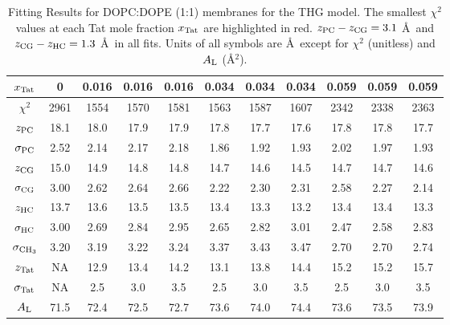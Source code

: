 \begin{table}[htbp]
  \centering
  \begin{tabular}{c|c|ccc|ccc|ccc}
    \hline
    $x_\textrm{Tat}$ & 0 & 0.016 & 0.016 & 0.016 & 0.034 & 0.034 & 0.034 & 0.059 & 0.059 & 0.059 \\
    \hline
    $\chi^2$ & 2961 & {\color{red}1554} & 1570 & 1581 & {\color{red}1563} & 1587 & 1607 & 2342 & {\color{red}2338} & 2363 \\     
    $z_\textrm{PC}$ & 18.1 & 18.0 & 17.9 & 17.9 & 17.8 & 17.7 & 17.6 & 17.8 & 17.8 & 17.7 \\
    $\sigma_\textrm{PC}$ & 2.52 & 2.14 & 2.17 & 2.18 & 1.86 & 1.92 & 1.93 & 2.02 & 1.97 & 1.93 \\
    $z_\textrm{CG}$ & 15.0 & 14.9 & 14.8 & 14.8 & 14.7 & 14.6 & 14.5 & 14.7 & 14.7 & 14.6 \\
    $\sigma_\textrm{CG}$ & 3.00 & 2.62 & 2.64 & 2.66 & 2.22 & 2.30 & 2.31 & 2.58 & 2.27 & 2.14 \\
    $z_\textrm{HC}$ & 13.7 & 13.6 & 13.5 & 13.5 & 13.4 & 13.3 & 13.2 & 13.4 & 13.4 & 13.3 \\ 
    $\sigma_\textrm{HC}$ & 3.00 & 2.69 & 2.84 & 2.95 & 2.65 & 2.82 & 3.01 & 2.47 & 2.58 & 2.83 \\
    $\sigma_{\textrm{CH}_3}$ & 3.20 & 3.19 & 3.22 & 3.24 & 3.37 & 3.43 & 3.47 & 2.70 & 2.70 & 2.74 \\
    $z_\textrm{Tat}$ & NA & 12.9 & 13.4 & 14.2 & 13.1 & 13.8 & 14.4 & 15.2 & 15.2 & 15.7 \\
    $\sigma_\textrm{Tat}$ & NA & 2.5 & 3.0 & 3.5 & 2.5 & 3.0 & 3.5 & 2.5 & 3.0 & 3.5 \\ 
    $A_\textrm{L}$ & 71.5 & 72.4 & 72.5 & 72.7 & 73.6 & 74.0 & 74.4 & 73.6 & 73.5 & 73.9 \\
    \hline
  \end{tabular}
  \caption[Fitting Results for DOPC:DOPE (1:1) membranes for the THG model]
  {Fitting Results for DOPC:DOPE (1:1) membranes for the THG model. 
  The smallest $\chi^2$ values at each Tat mole fraction $x_\textrm{Tat}$ are highlighted in red.
  $z_\textrm{PC}-z_\textrm{CG} = 3.1$ \AA\ and $z_\textrm{CG}-z_\textrm{HC} = 1.3$ \AA\ in all fits.
  Units of all symbols are \AA\ except for $\chi^2$ (unitless) and $A_\textrm{L}$ (\AA$^2$).}
  \label{tab:DOPCDOPE1to1_fit_results}
\end{table}

